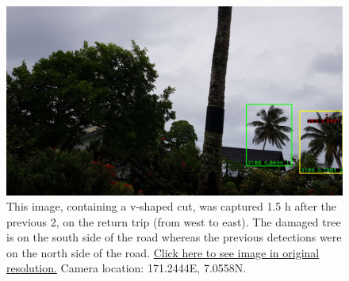 \documentclass[12pt,letterpaper,english,bibliography=totocnumbered, abstract=on]{scrartcl}
\begin{document}
\begin{figure}
	\centering
	\includegraphics[width=\linewidth]{images/IMG_20231007_143930}
	\caption{This image, containing a v-shaped cut, was captured 1.5 h after the previous 2, on the return trip (from west to east). The damaged tree is on the south side of the road whereas the previous detections were on the north side of the road. \href{https://aubreymoore.github.io/Majuro01_updated/700_990/20231007/14/IMG_20231007_143930.jpg}{Click here to see image in original resolution.} Camera location:  171.2444\degree E, 7.0558\degree N.}
	\label{fig:143930}
\end{figure}
\end{document}
